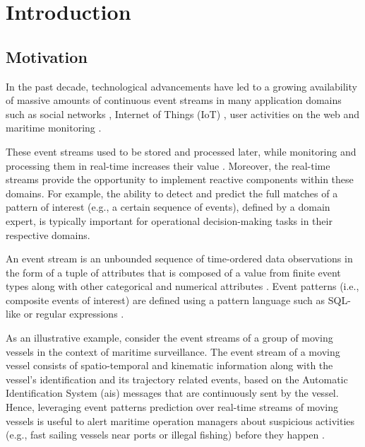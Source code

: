 \chapter{Introduction}

\section{Motivation}
\par In the past decade, technological advancements have led to a growing availability of massive amounts of continuous event streams in many application domains such as social networks \cite{reuter2012event,mathioudakis2010twittermonitor}, Internet of Things (IoT) \cite{miorandi2012internet}, user activities on the web \cite{banerjee2001clickstream,metwally2005duplicate} and maritime monitoring \cite{patroumpas2015event,laxhammar2010conformal}.

\par These event streams used to be stored and processed later, while monitoring and processing them in real-time increases their value \cite{carney2002monitoring}. Moreover, the real-time streams provide the opportunity to implement reactive components within these domains.  For example, the ability to detect and predict the full matches of a pattern of interest (e.g., a certain sequence of events), defined by a domain expert, is typically important for operational decision-making tasks in their respective domains.

\par An event stream is an unbounded sequence of time-ordered data observations in the form of a tuple of attributes that is composed of a value from finite event types along with other categorical and numerical attributes \cite{agrawal2008efficient,schultz2009distributed,zhou_pattern_2015,flouris2017issues}. Event patterns (i.e., composite events of interest) are defined using a pattern language such as SQL-like \cite{schultz2009distributed} or regular expressions \cite{alevizos2017event}.

\par As an illustrative example, consider the event streams of a group of moving vessels in the context of maritime surveillance. The event stream of a moving vessel consists of spatio-temporal and kinematic information along with the vessel's identification and its trajectory related events, based on the Automatic Identification System (\ac{ais}) \cite{ais} messages that are continuously sent by the vessel. Hence, leveraging event patterns prediction over real-time streams of moving vessels is useful to alert maritime operation managers about suspicious activities (e.g., fast sailing vessels near ports or illegal fishing) before they happen \cite{patroumpas2015event}. 

